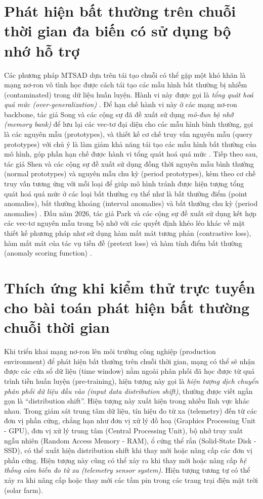 \section{Phát hiện bất thường trên chuỗi thời gian đa biến có sử dụng bộ nhớ hỗ trợ}
Các phương pháp MTSAD dựa trên tái tạo chuỗi có thể gặp một khó khăn là mạng nơ-ron vô tình học được cách tái tạo các mẫu hình bất thường bị nhiễm (contaminated) trong dữ liệu huấn luyện. Hành vi này được gọi là \textit{tổng quát hoá quá mức (over-generalization)} \cite{10.5555/3666122.3668647} \cite{shen2025learn}. Để hạn chế hành vi này ở các mạng nơ-ron backbone, tác giả Song và các cộng sự đã đề xuất sử dụng \textit{mô-đun bộ nhớ (memory bank)} để lưu lại các vec-tơ đại diện cho các mẫu hình bình thường, gọi là các nguyên mẫu (prototypes), và thiết kế cơ chế truy vấn nguyên mẫu (query prototypes) với chủ ý là làm giảm khả năng tái tạo các mẫu hình bất thường của mô hình, góp phần hạn chế được hành vi tổng quát hoá quá mức \cite{10.5555/3666122.3668647}. Tiếp theo sau, tác giả Shen và các cộng sự đề xuất sử dụng đồng thời nguyên mẫu bình thường (normal prototypes) và nguyên mẫu chu kỳ (period prototypes), kèm theo cơ chế truy vấn tương ứng với mỗi loại để giúp mô hình tránh được hiện tượng tổng quát hoá quá mức ở các loại bất thường cụ thể như là bất thường điểm (point anomalies), bất thường khoảng (interval anomalies) và bất thường chu kỳ (period anomalies) \cite{shen2025learn}. Đầu năm 2026, tác giả Park và các cộng sự đề xuất sử dụng kết hợp các vec-tơ nguyên mẫu trong bộ nhớ với các quyết định khéo léo khác về mặt thiết kế phương pháp như sử dụng hàm mất mát tương phản (contrastive loss), hàm mất mát của tác vụ tiền đề (pretext loss) và hàm tính điểm bất thường (anomaly scoring function) \cite{park2026paano}.

\section{Thích ứng khi kiểm thử trực tuyến cho bài toán phát hiện bất thường chuỗi thời gian}
Khi triển khai mạng nơ-ron lên môi trường công nghiệp (production environment) để phát hiện bất thường trên chuỗi thời gian, mạng có thể sẽ nhận được các cửa sổ dữ liệu (time window) nằm ngoài phân phối đã học được từ quá trình tiền huấn luyện (pre-training), hiện tượng này gọi là \textit{hiện tượng dịch chuyển phân phối dữ liệu đầu vào (input data distribution shift)}, thường được viết ngắn gọn là ``distribution shift''. Hiện tượng này xuất hiện trong nhiều lĩnh vực khác nhau. Trong giám sát trung tâm dữ liệu, tín hiệu đo từ xa (telemetry) đến từ các đơn vị phần cứng, chẳng hạn như đơn vị xử lý đồ hoạ (Graphics Processing Unit - GPU), đơn vị xử lý trung tâm (Central Processing Unit), bộ nhớ truy xuất ngẫu nhiên (Random Access Memory - RAM), ổ cứng thể rắn (Solid-State Disk - SSD), có thể xuất hiện distribution shift khi thay mới hoặc nâng cấp các đơn vị phần cứng. Hiện tượng này cũng có thể xảy ra khi thay mới hoặc nâng cấp \textit{hệ thống cảm biến đo từ xa (telemetry sensor system)}. Hiện tượng tương tự có thể xảy ra khi nâng cấp hoặc thay mới các tấm pin trong các trang trại điện mặt trời (solar farm).


